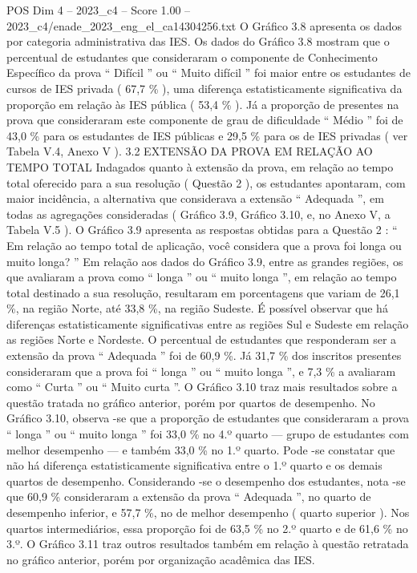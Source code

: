 \begin{textsample}{POS Dim 4 – 2023\_c4 – Score 1.00 – 2023\_c4/enade\_2023\_eng\_el\_ca14304256.txt}
O Gráfico 3.8 apresenta os dados por categoria administrativa das IES.
Os dados do Gráfico 3.8 mostram que o percentual de estudantes que consideraram o componente de Conhecimento Específico da prova “ Difícil ” ou “ Muito difícil ” foi maior entre os estudantes de cursos de IES privada ( 67,7 \% ), uma diferença estatisticamente significativa da proporção em relação às IES pública ( 53,4 \% ).
Já a proporção de presentes na prova que consideraram este componente de grau de dificuldade “ Médio ” foi de 43,0 \% para os estudantes de IES públicas e 29,5 \% para os de IES privadas ( ver Tabela V.4, Anexo V ). 3.2 EXTENSÃO DA PROVA EM RELAÇÃO AO TEMPO TOTAL Indagados quanto à extensão da prova, em relação ao tempo total oferecido para a sua resolução ( Questão 2 ), os estudantes apontaram, com maior incidência, a alternativa que considerava a extensão “ Adequada ”, em todas as agregações consideradas ( Gráfico 3.9, Gráfico 3.10, e, no Anexo V, a Tabela V.5 ).
O Gráfico 3.9 apresenta as respostas obtidas para a Questão 2 : “ Em relação ao tempo total de aplicação, você considera que a prova foi longa ou muito longa? ” Em relação aos dados do Gráfico 3.9, entre as grandes regiões, os que avaliaram a prova como “ longa ” ou “ muito longa ”, em relação ao tempo total destinado a sua resolução, resultaram em porcentagens que variam de 26,1 \%, na região Norte, até 33,8 \%, na região Sudeste.
É possível observar que há diferenças estatisticamente significativas entre as regiões Sul e Sudeste em relação as regiões Norte e Nordeste.
O percentual de estudantes que responderam ser a extensão da prova “ Adequada ” foi de 60,9 \%.
Já 31,7 \% dos inscritos presentes consideraram que a prova foi “ longa ” ou “ muito longa ”, e 7,3 \% a avaliaram como “ Curta ” ou “ Muito curta ”.
O Gráfico 3.10 traz mais resultados sobre a questão tratada no gráfico anterior, porém por quartos de desempenho.
No Gráfico 3.10, observa -se que a proporção de estudantes que consideraram a prova “ longa ” ou “ muito longa ” foi 33,0 \% no 4.º quarto — grupo de estudantes com melhor desempenho — e também 33,0 \% no 1.º quarto.
Pode -se constatar que não há diferença estatisticamente significativa entre o 1.º quarto e os demais quartos de desempenho.
Considerando -se o desempenho dos estudantes, nota -se que 60,9 \% consideraram a extensão da prova “ Adequada ”, no quarto de desempenho inferior, e 57,7 \%, no de melhor desempenho ( quarto superior ).
Nos quartos intermediários, essa proporção foi de 63,5 \% no 2.º quarto e de 61,6 \% no 3.º.
O Gráfico 3.11 traz outros resultados também em relação à questão retratada no gráfico anterior, porém por organização acadêmica das IES.

\end{textsample}
